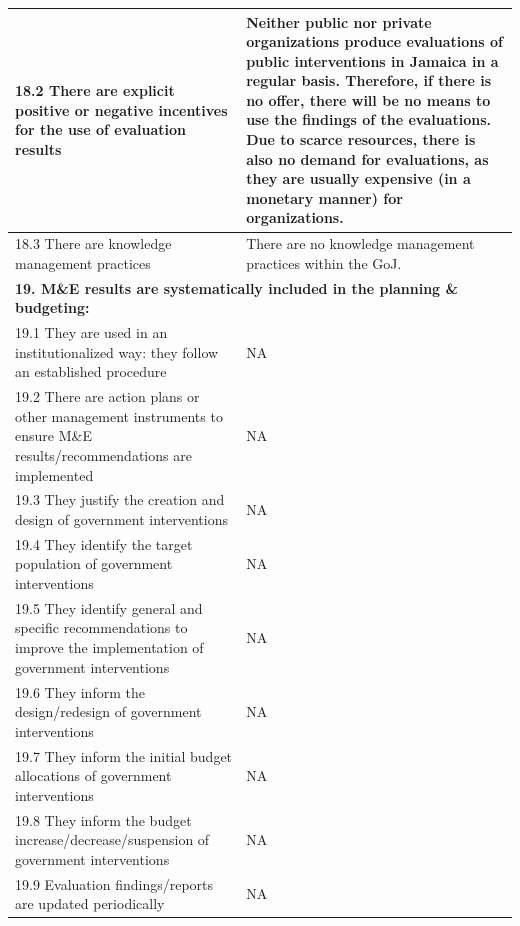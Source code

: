 \documentclass[
  10pt,
]{book}
\begin{document}
\begin{table}
\begin{tabular}[t]{l|l}
\hline
\hspace{1em}18.2 There are explicit positive or negative incentives for the use of evaluation results & Neither public nor private organizations produce evaluations of public interventions in Jamaica in a regular basis. Therefore, if there is no offer, there will be no means to use the findings of the evaluations. Due to scarce resources, there is also no demand for evaluations, as they are usually expensive (in a monetary manner) for organizations.\\
\hline
\hspace{1em}18.3 There are knowledge management practices & There are no knowledge management practices within the GoJ.\\
\hline
\multicolumn{2}{l}{\textbf{19. M\&E results are systematically included in the planning \& budgeting:}}\\
\hline
\hspace{1em}19.1 They are used in an institutionalized way: they follow an established procedure & NA\\
\hline
\hspace{1em}19.2 There are action plans or other management instruments to ensure M\&E results/recommendations are implemented & NA\\
\hline
\hspace{1em}19.3 They justify the creation and design of government interventions & NA\\
\hline
\hspace{1em}19.4 They identify the target population of government interventions & NA\\
\hline
\hspace{1em}19.5 They identify general and specific recommendations to improve the implementation of government interventions & NA\\
\hline
\hspace{1em}19.6 They inform the design/redesign of government interventions & NA\\
\hline
\hspace{1em}19.7 They inform the initial budget allocations of government interventions & NA\\
\hline
\hspace{1em}19.8 They inform the budget increase/decrease/suspension of government interventions & NA\\
\hline
\hspace{1em}19.9 Evaluation findings/reports are updated periodically & NA\\
\hline

\end{tabular}
\end{table}
\end{document}
